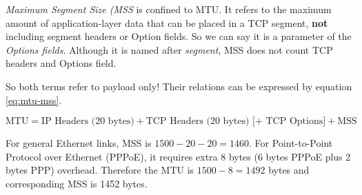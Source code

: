 \textit{Maximum Segment Size (MSS} is confined to MTU. It refers
to the maximum amount of application-layer data that can be placed
in a TCP segment, \textbf{not} including segment headers or Option
fields. So we can say it is a parameter of the \textit{Options
  fields}. Although it is named after \textit{segment}, MSS does
not count TCP headers and Options field.

So both terms refer to payload only! Their relations can be
expressed by equation \eqref{eq:mtu-mss}.

\begin{equation}
  \label{eq:mtu-mss}
    \text{MTU} = \text{IP Headers (20 bytes)} + \text{TCP Headers (20 bytes)} \text{ [+ TCP Options]} + \text{MSS}
\end{equation}

For general Ethernet links, MSS is $1500 - 20 - 20 = 1460$. For
Point-to-Point Protocol over Ethernet (PPPoE), it requires extra 8
bytes (6 bytes PPPoE plus 2 bytes PPP) overhead. Therefore the MTU
is $1500 - 8 = 1492$ bytes and corresponding MSS is 1452 bytes.


